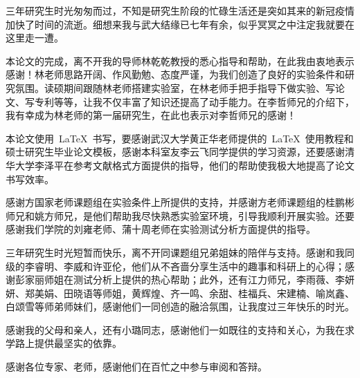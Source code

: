 {\songti{}三年研究生时光匆匆而过，不知是研究生阶段的忙碌生活还是突如其来的新冠疫情加快了时间的流逝。细想来我与武大结缘已七年有余，似乎冥冥之中注定我就要在这里走一遭。

本论文的完成，离不开我的导师林乾乾教授的悉心指导和帮助，在此我由衷地表示感谢！林老师思路开阔、作风勤勉、态度严谨，为我们创造了良好的实验条件和研究氛围。读硕期间跟随林老师搭建实验室，在林老师手把手指导下做实验、写论文、写专利等等，让我不仅丰富了知识还提高了动手能力。在李哲师兄的介绍下，我有幸成为林老师的第一届研究生，在此也表示对李哲师兄的感谢！


本论文使用~\LaTeX~书写，要感谢武汉大学黄正华老师提供的~\LaTeX~使用教程和硕士研究生毕业论文模板，感谢本科室友李云飞同学提供的学习资源，还要感谢清华大学李泽平在参考文献格式方面提供的指导，他们的帮助使我极大地提高了论文书写效率。

感谢方国家老师课题组在实验条件上所提供的支持，并感谢方老师课题组的桂鹏彬师兄和姚方师兄，是他们帮助我尽快熟悉实验室环境，引导我顺利开展实验。还要感谢我们学院的刘雍老师、蒲十周老师在实验测试分析方面提供的指导。

三年研究生时光短暂而快乐，离不开同课题组兄弟姐妹的陪伴与支持。感谢和我同级的李睿明、李威和许亚伦，他们从不吝啬分享生活中的趣事和科研上的心得；感谢彭家丽师姐在测试分析上提供的热心帮助；此外，还有江力师兄，李雨薇、李妍妍、郑美娟、田晓语等师姐，黄辉煌、齐一鸣、余甜、桂福兵、宋建楠、喻岚鑫、白颂雪等师弟师妹们，感谢他们一同创造的融洽氛围，让我度过三年快乐的时光。


感谢我的父母和亲人，还有小璐同志，感谢他们一如既往的支持和关心，为我在求学路上提供最坚实的依靠。

感谢各位专家、老师，感谢他们在百忙之中参与审阅和答辩。}

  \iflib
  \else
  \newpage
  \cleardoublepage
  \fi







